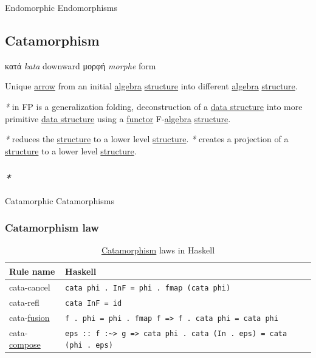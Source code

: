 \documentclass[a4paper,14pt,oneside]{book}
\begin{document}
\label{org85a80dd}Endomorphic
\label{org847b736}Endomorphisms

\subsection{\label{orgd0787b4}Catamorphism}
\label{sec:orgfb219d9}
κατά \emph{kata} downward
μορφή \emph{morphe} form

Unique \hyperref[org0b51b24]{arrow} from an initial \hyperref[orgefdcb85]{algebra} \hyperref[org105c77d]{structure} into different \hyperref[orgefdcb85]{algebra} \hyperref[org105c77d]{structure}.

\emph{*} in FP is a generalization folding, deconstruction of a \hyperref[org627fed1]{data structure} into more primitive \hyperref[org627fed1]{data structure} using a \hyperref[orgdd3b6fb]{functor} F-\hyperref[orgefdcb85]{algebra} \hyperref[org105c77d]{structure}. 

\emph{*} reduces the \hyperref[org105c77d]{structure} to a lower level \hyperref[org105c77d]{structure}.
\emph{*} creates a projection of a \hyperref[org105c77d]{structure} to a lower level \hyperref[org105c77d]{structure}.

\subsubsection{\emph{*}}
\label{sec:org90c425f}

\label{org62e62b2}Catamorphic
\label{orgb464712}Catamorphisms

\subsubsection{\label{org212027b}Catamorphism law}
\label{sec:org42da7df}
\begin{table}[htbp]
\caption{\label{tab--catamorphism-law-in-haskell}\hyperref[orgd0787b4]{Catamorphism} laws in Haskell}
\centering
\begin{tabu} spread \linewidth {ll}
\toprule
Rule name & Haskell\\
\midrule
cata-cancel & \texttt{cata phi . InF = phi . fmap (cata phi)}\\
cata-refl & \texttt{cata InF = id}\\
cata-\hyperref[orgb8e15ba]{fusion} & \texttt{f . phi = phi . fmap f => f . cata phi = cata phi}\\
cata-\hyperref[org217655a]{compose} & \texttt{eps :: f :\textasciitilde{}> g => cata phi . cata (In . eps) = cata (phi . eps)}\\
\bottomrule
\end{tabu}
\end{table}
\end{document}
